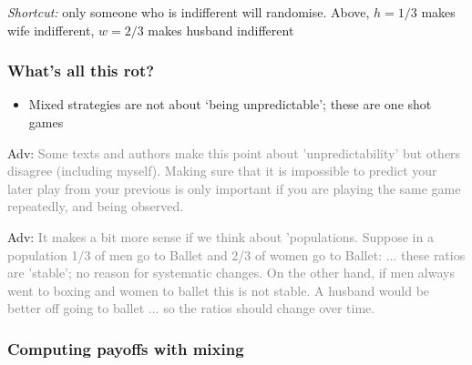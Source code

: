 \documentclass[]{article}
\providecommand{\tightlist}{%
  \setlength{\itemsep}{0pt}\setlength{\parskip}{0pt}}
\begin{document}
\emph{Shortcut:} only someone who is indifferent will randomise. Above,
\(h=1/3\) makes wife indifferent, \(w=2/3\) makes husband indifferent

\hypertarget{whats-all-this-rot}{%
\subsubsection{What's all this rot?}\label{whats-all-this-rot}}

\begin{itemize}
\tightlist
\item
  Mixed strategies are not about `being unpredictable'; these are one
  shot games
\end{itemize}

\textcolor{RawSienna}{Adv:}
\textcolor{gray}{Some texts and authors make this point about 'unpredictability' but others disagree (including myself). Making sure that it is impossible to predict your later play from your previous is only important if you are playing the same game repeatedly, and being observed.}

\textcolor{RawSienna}{Adv:}
\textcolor{gray}{It makes a bit more sense if we think about 'populations.
Suppose in a population 1/3 of men go to Ballet and 2/3 of women go to Ballet:
... these ratios are 'stable'; no reason for systematic changes.
On the other hand, if men always went to boxing and women to ballet this is not stable. A husband would be better off going to ballet ... so the ratios should change over time.}

\hypertarget{computing-payoffs-with-mixing}{%
\subsubsection{Computing payoffs with
mixing}\label{computing-payoffs-with-mixing}}
\end{document}
